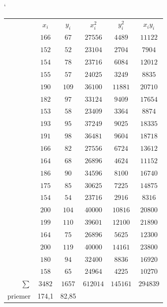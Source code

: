 \documentclass[pdftex, 11pt, a4paper, titlepage]{article}
\begin{document}
    \begin{table}[H]
        \catcode`
        \begin{tabular}{r|c|c|c|c|c|}
            \cline{2-6}
            &$x_i$ & $y_i$ & $x_i^2$ & $y_i^2$ & $x_iy_i$ \\
            \cline{2-6}
            & $166$ & $67$    & $27556$   & $4489$    & $11122$ \\
            & $152$ & $52$    & $23104$   & $2704$    & $7904$ \\
            & $154$ & $78$    & $23716$   & $6084$    & $12012$ \\
            & $155$ & $57$    & $24025$   & $3249$    & $8835$ \\
            & $190$ & $109$   & $36100$   & $11881$   & $20710$ \\
            & $182$ & $97$    & $33124$   & $9409$    & $17654$ \\
            & $153$ & $58$    & $23409$   & $3364$    & $8874$ \\
            & $193$ & $95$    & $37249$   & $9025$    & $18335$ \\
            & $191$ & $98$    & $36481$   & $9604$    & $18718$ \\
            & $166$ & $82$    & $27556$   & $6724$    & $13612$ \\
            & $164$ & $68$    & $26896$   & $4624$    & $11152$ \\
            & $186$ & $90$    & $34596$   & $8100$    & $16740$ \\
            & $175$ & $85$    & $30625$   & $7225$    & $14875$ \\
            & $154$ & $54$    & $23716$   & $2916$    & $8316$ \\
            & $200$ & $104$   & $40000$   & $10816$   & $20800$ \\
            & $199$ & $110$   & $39601$   & $12100$   & $21890$ \\
            & $164$ & $75$    & $26896$   & $5625$    & $12300$ \\
            & $200$ & $119$   & $40000$   & $14161$   & $23800$ \\
            & $180$ & $94$    & $32400$   & $8836$    & $16920$ \\
            & $158$ & $65$    & $24964$   & $4225$    & $10270$ \\
            \cline{2-6}
            $\sum$ & $3482$ & $1657$ & $612014$ & $145161$ & $294839$ \\
            \cline{2-6}
            priemer & 174,1 & 82,85 & \multicolumn{3}{c}{} \\
            \cline{2-3}
        \end{tabular}
    \end{table}
\end{document}
